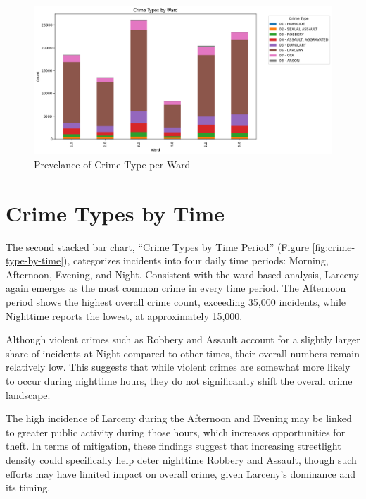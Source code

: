 \documentclass{report}
\begin{document}
	 \begin{figure}[ht]
		\begin{center}
			\advance\leftskip-3cm
			\advance\rightskip-3cm
			\includegraphics[keepaspectratio=true,scale=.6]{crime-types-by-ward}
			\caption{Prevelance of Crime Type per Ward}
			\label{fig:crime-type-by-ward}
		\end{center}
	\end{figure}
	
	\newpage
	\section{Crime Types by Time}
	\par The second stacked bar chart, “Crime Types by Time Period” (Figure \ref{fig:crime-type-by-time}), categorizes incidents into four daily time periods: Morning, Afternoon, Evening, and Night. Consistent with the ward-based analysis, Larceny again emerges as the most common crime in every time period. The Afternoon period shows the highest overall crime count, exceeding 35,000 incidents, while Nighttime reports the lowest, at approximately 15,000.
	
	Although violent crimes such as Robbery and Assault account for a slightly larger share of incidents at Night compared to other times, their overall numbers remain relatively low. This suggests that while violent crimes are somewhat more likely to occur during nighttime hours, they do not significantly shift the overall crime landscape.
	
	The high incidence of Larceny during the Afternoon and Evening may be linked to greater public activity during those hours, which increases opportunities for theft. In terms of mitigation, these findings suggest that increasing streetlight density could specifically help deter nighttime Robbery and Assault, though such efforts may have limited impact on overall crime, given Larceny's dominance and its timing.
        
\end{document}
